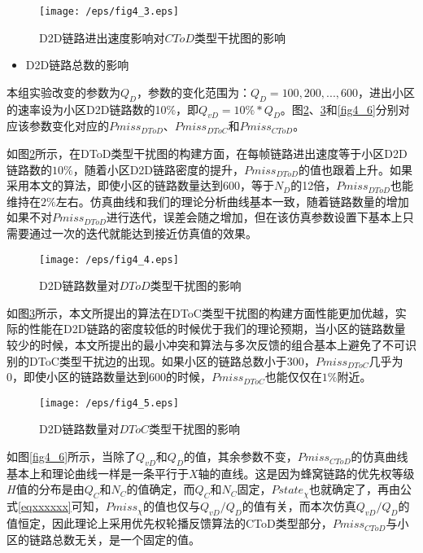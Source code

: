 \documentclass[figurelist,tablelist,algorithmlist,nomlist,masters]{seuthesix}
\begin{document}
	\begin{figure}[!h]
		\centering
		\texttt{[image: /eps/fig4\_3.eps]}
		\caption{D2D链路进出速度影响对$CToD$类型干扰图的影响}
		\label{fig4_3}
	\end{figure}
	
	\begin{itemize}
		\item D2D链路总数的影响
	\end{itemize}
	
	本组实验改变的参数为$Q_{D}$，参数的变化范围为：$Q_{D} = 100,200,...,600$，进出小区的速率设为小区D2D链路数的10\%，即$Q_{vD} = 10\% * Q_{D}$。图\ref{fig4_4}、\ref{fig4_5}和\ref{fig4_6}分别对应该参数变化对应的$Pmiss_{DToD}$、$Pmiss_{DToC}$和$Pmiss_{CToD}$。
	
	如图\ref{fig4_4}所示，在DToD类型干扰图的构建方面，在每帧链路进出速度等于小区D2D链路数的$10\%$，随着小区D2D链路密度的提升，$Pmiss_{DToD}$的值也跟着上升。如果采用本文的算法，即使小区的链路数量达到$600$，等于$N_{D}$的12倍，$Pmiss_{DToD}$也能维持在$2\%$左右。仿真曲线和我们的理论分析曲线基本一致，随着链路数量的增加如果不对$Pmiss_{DToD}$进行迭代，误差会随之增加，但在该仿真参数设置下基本上只需要通过一次的迭代就能达到接近仿真值的效果。

	\begin{figure}[!h]
		\centering
		\texttt{[image: /eps/fig4\_4.eps]}
		\caption{D2D链路数量对$DToD$类型干扰图的影响}
		\label{fig4_4}
	\end{figure}

	
	如图\ref{fig4_5}所示，本文所提出的算法在DToC类型干扰图的构建方面性能更加优越，实际的性能在D2D链路的密度较低的时候优于我们的理论预期，当小区的链路数量较少的时候，本文所提出的最小冲突和算法与多次反馈的组合基本上避免了不可识别的DToC类型干扰边的出现。如果小区的链路总数小于$300$，$Pmiss_{DToC}$几乎为0，即使小区的链路数量达到$600$的时候，$Pmiss_{DToC}$也能仅仅在$1\%$附近。
	

	\begin{figure}[!h]
		\centering
		\texttt{[image: /eps/fig4\_5.eps]}
		\caption{D2D链路数量对$DToC$类型干扰图的影响}
		\label{fig4_5}
	\end{figure}


	如图\ref{fig4_6}所示，当除了$Q_{vD}$和$Q_D$的值，其余参数不变，$Pmiss_{CToD}$的仿真曲线基本上和理论曲线一样是一条平行于$X$轴的直线。这是因为蜂窝链路的优先权等级$H$值的分布是由$Q_C$和$N_C$的值确定，而$Q_C$和$N_C$固定，$Pstate_{\chi }$也就确定了，再由公式\ref{eqxxxxxx}可知，$Pmiss_{\chi }$的值也仅与$Q_{vD}/Q_D$的值有关，而本次仿真$Q_{vD}/Q_D$的值恒定，因此理论上采用优先权轮播反馈算法的CToD类型部分，$Pmiss_{CToD}$与小区的链路总数无关，是一个固定的值。
	
\end{document}
